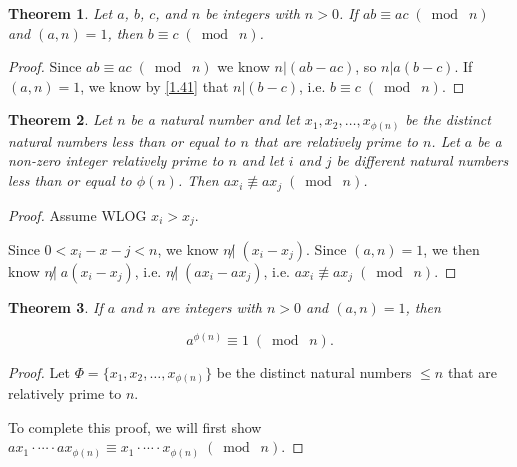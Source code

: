 \documentclass{article}
\newtheorem{thm}{Theorem}[section]
\numberwithin{equation}{thm}
\providecommand{\gmod}[1]{\; (\bmod \; #1)}
\begin{document}
\begin{thm} \label{4.30}
  Let $a$, $b$, $c$, and $n$ be integers with $n > 0$. If $ab \equiv ac \gmod n$ and $(a, n) = 1$, then $b \equiv c \gmod n$.
\end{thm}

\begin{proof}
  Since $ab \equiv ac \gmod n$ we know $n | (ab - ac)$, so $n | a(b-c)$. If $(a, n) = 1$, we know by \ref{1.41} that $n | (b-c)$, i.e. $b \equiv c \gmod n$.
\end{proof}



\begin{thm} \label{4.31}
  Let $n$ be a natural number and let $x_1, x_2, \ldots, x_{\phi (n)}$ be the distinct natural numbers less than or equal to $n$ that are relatively prime to $n$. Let $a$ be a non-zero integer relatively prime to $n$ and let $i$ and $j$ be different natural numbers less than or equal to $\phi (n)$. Then $ax_i \not \equiv ax_j \gmod n$.
\end{thm}

\begin{proof}
  Assume WLOG $x_i > x_j$.

  Since $0 < x_i - x-j < n$, we know $n \not | \; (x_i - x_j)$. Since $(a, n) = 1$, we then know $n \not | \; a(x_i - x_j)$, i.e. $n \not | \; (ax_i - ax_j)$, i.e. $ax_i \not \equiv ax_j \gmod n$.
\end{proof}



\begin{thm} \label{4.32}
  If $a$ and $n$ are integers with $n > 0$ and $(a, n) = 1$, then

  $$a^{\phi (n)} \equiv 1 \gmod n .$$
\end{thm}

\begin{proof}
  Let $\Phi = \{x_1, x_2, \ldots, x_{\phi (n)} \}$ be the distinct natural numbers $\leq n$ that are relatively prime to $n$.

  To complete this proof, we will first show $ax_1 \cdot \cdots \cdot ax_{\phi (n)} \equiv x_1 \cdot \cdots \cdot x_{\phi (n)} \gmod n$.
\end{proof}
\end{document}
